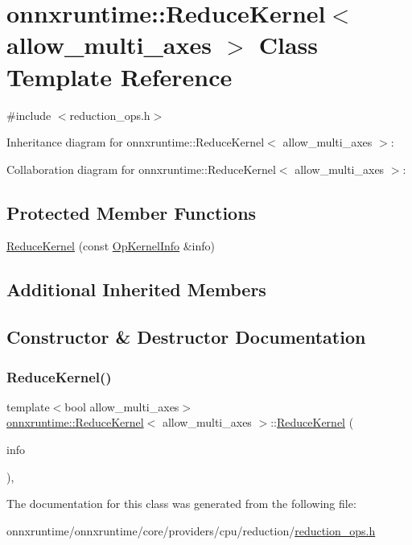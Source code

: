 \hypertarget{classonnxruntime_1_1ReduceKernel}{}\section{onnxruntime\+:\+:Reduce\+Kernel$<$ allow\+\_\+multi\+\_\+axes $>$ Class Template Reference}
\label{classonnxruntime_1_1ReduceKernel}


{\ttfamily \#include $<$reduction\+\_\+ops.\+h$>$}



Inheritance diagram for onnxruntime\+:\+:Reduce\+Kernel$<$ allow\+\_\+multi\+\_\+axes $>$\+:


Collaboration diagram for onnxruntime\+:\+:Reduce\+Kernel$<$ allow\+\_\+multi\+\_\+axes $>$\+:
\subsection*{Protected Member Functions}
\begin{DoxyCompactItemize}
\item 
\mbox{\hyperlink{classonnxruntime_1_1ReduceKernel_ad829ae6945451c3d09dcc6bb14d21806}{Reduce\+Kernel}} (const \mbox{\hyperlink{classonnxruntime_1_1OpKernelInfo}{Op\+Kernel\+Info}} \&info)
\end{DoxyCompactItemize}
\subsection*{Additional Inherited Members}


\subsection{Constructor \& Destructor Documentation}
\mbox{\label{classonnxruntime_1_1ReduceKernel_ad829ae6945451c3d09dcc6bb14d21806}} 
\subsubsection{\texorpdfstring{Reduce\+Kernel()}{ReduceKernel()}}
{\footnotesize\ttfamily template$<$bool allow\+\_\+multi\+\_\+axes$>$ \\
\mbox{\hyperlink{classonnxruntime_1_1ReduceKernel}{onnxruntime\+::\+Reduce\+Kernel}}$<$ allow\+\_\+multi\+\_\+axes $>$\+::\mbox{\hyperlink{classonnxruntime_1_1ReduceKernel}{Reduce\+Kernel}} (\begin{DoxyParamCaption}\item[{const \mbox{\hyperlink{classonnxruntime_1_1OpKernelInfo}{Op\+Kernel\+Info}} \&}]{info }\end{DoxyParamCaption})\hspace{0.3cm}{\ttfamily [inline]}, {\ttfamily [protected]}}



The documentation for this class was generated from the following file\+:\begin{DoxyCompactItemize}
\item 
onnxruntime/onnxruntime/core/providers/cpu/reduction/\mbox{\hyperlink{cpu_2reduction_2reduction__ops_8h}{reduction\+\_\+ops.\+h}}\end{DoxyCompactItemize}
